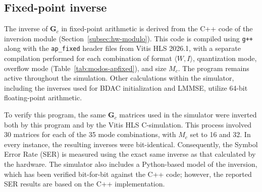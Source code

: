 \begin{figure}[!ht]
\vspace{4pt}
\end{figure}

\subsection{\texorpdfstring{Fixed-point inverse}{Fixed-point inverse}}\label{subsubsec:simul-inversa}
The inverse of $\mathbf{G}_c$ in fixed-point arithmetic is derived from the C++ code of the inversion module (Section~\ref{subsec:hw-modulo}). This code is compiled using \texttt{g++} along with the \texttt{ap\_fixed} header files from Vitis HLS 2026.1, with a separate compilation performed for each combination of format $\langle W, I\rangle$, quantization mode, overflow mode (Table~\ref{tab:modos-apfixed}), and size $M_c$. The program remains active throughout the simulation. Other calculations within the simulator, including the inverses used for BDAC initialization and LMMSE, utilize 64-bit floating-point arithmetic.

To verify this program, the same $\mathbf{G}_c$ matrices used in the simulator were inverted both by this program and by the Vitis HLS C-simulation. This process involved 30 matrices for each of the 35 mode combinations, with $M_c$ set to 16 and 32. In every instance, the resulting inverses were bit-identical. Consequently, the Symbol Error Rate (SER) is measured using the exact same inverse as that calculated by the hardware. The simulator also includes a Python-based model of the inversion, which has been verified bit-for-bit against the C++ code; however, the reported SER results are based on the C++ implementation.



